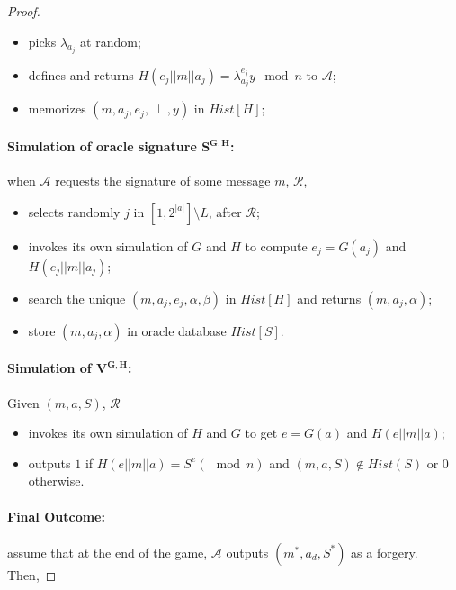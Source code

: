 \documentclass[a4paper,11pt]{article}
\begin{document}
\begin{proof}
\begin{itemize}
  \begin{itemize}
     \item     picks $\lambda_{a_{j}}$ at random;
     \item     defines and returns $H(e_{j}||m||a_{j}) = \lambda^{e_{j}}_{a_{j}}y \mod n$ to $\mathcal{A}$;
     \item     memorizes $(m, a_{j}, e_{j}, \perp, y)$ in $Hist [H]$;
  \end{itemize}

\end{itemize}

\paragraph{Simulation of oracle signature $\mathbf{S^{G,H}}$:} when $\mathcal{A }$ requests the signature of some message $m$, $\mathcal{R}$,
\begin{itemize}
\item selects  randomly $j$ in $[1,2^{|a|}]\setminus L$, after  $\mathcal{R}$;
\item invokes its own simulation of $G$ and $H$ to compute $e_{j}=G(a_{j})$  and $H(e_{j}||m||a_{j})$;
    \item search the unique $(m, a_{j},  e_{j},  \alpha, \beta)$ in $Hist [H]$ and returns $(m, a_{j},\alpha) $;
    \item  store $(m, a_{j},\alpha) $ in oracle database $Hist [S]$.
\end{itemize}

\paragraph{Simulation of $\mathbf{ V^{G,H}}$:} Given $(m, a, S)$, $\mathcal{R}$

 \begin{itemize}
    \item    invokes its own simulation of $H$ and $G$ to get  $e=G(a)$  and $H(e||m||a)$;
    \item    outputs $1$ if $H(e||m||a) = S^{e} (\mod n)$ and $(m, a, S) \notin  Hist(S)$ or $0$ otherwise.
 \end{itemize}

\paragraph{Final Outcome:} assume that at the end of the game, $\mathcal{A}$ outputs $(m^{*}, a_{d} , S^{*})$ as a
forgery. Then,


\end{proof}
\end{document}
